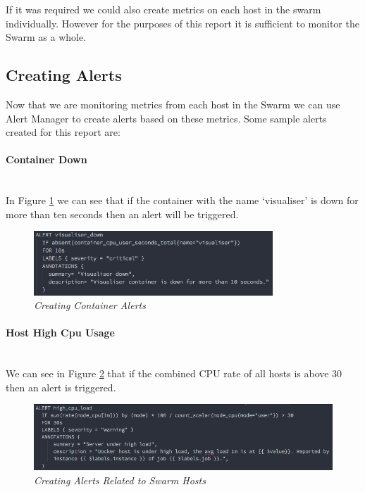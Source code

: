 If it was required we could also create metrics on each host in the swarm individually. However for the purposes of this report it is sufficient to monitor the Swarm as a whole.

\subsection{Creating Alerts}
Now that we are monitoring metrics from each host in the Swarm we can use Alert Manager to create alerts based on these metrics. Some sample alerts created for this report are:

\paragraph{Container Down}\mbox{}\\
In Figure \ref{fig:visualiser-down} we can see that if the container with the name `visualiser' is down for more than ten seconds then an alert will be triggered. 
\begin{figure}[!h]
	\centering
	\includegraphics*[width=0.8\textwidth]{components/images/visualiser-down}
	\caption{\em Creating Container Alerts}
	\label{fig:visualiser-down}
\end{figure}
\newpage
\paragraph{Host High Cpu Usage}\mbox{}\\
We can see in Figure \ref{fig:host-alert} that if the combined CPU rate of all hosts is above 30 then an alert is triggered. 
\begin{figure}[!h]
	\centering
	\includegraphics*[width=\textwidth]{components/images/host-alert}
	\caption{\em Creating Alerts Related to Swarm Hosts}
	\label{fig:host-alert}
\end{figure}

